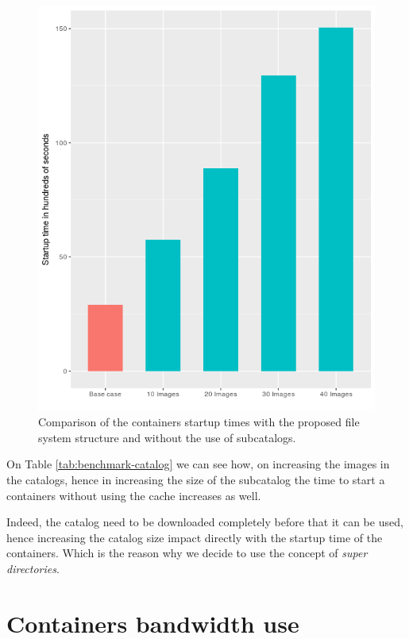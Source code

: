 \begin{figure}[]{}
    \includegraphics[width=\textwidth]{gfx/runtime-catalog}
        \caption{Comparison of the containers startup times with the proposed file system structure and without the use of subcatalogs.}
        \label{fig:startup-time}
\end{figure}


On Table \ref{tab:benchmark-catalog} we can see how, on increasing the images
in the catalogs, hence in increasing the size of the subcatalog the
time to start a containers without using the cache increases as well.

Indeed, the catalog need to be downloaded completely before that it can be
used, hence increasing the catalog size impact directly with the startup time
of the containers. Which is the reason why we decide to use the concept of
\textit{super directories}.

\section{Containers bandwidth use}

